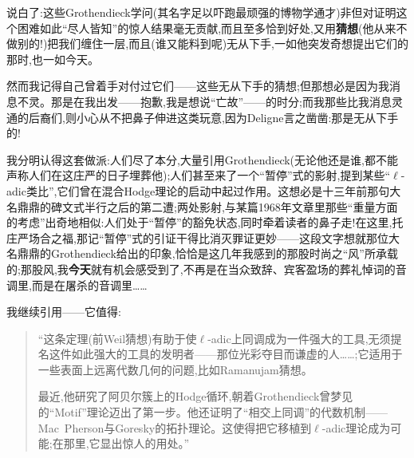 说白了:这些Grothendieck学问(其名字足以吓跑最顽强的博物学通才)非但对证明这个困难如此“尽人皆知”的惊人结果毫无贡献,而且至多恰到好处,又用\textbf{猜想}(他从来不做别的!)把我们缠住一层,而且(谁又能料到呢)无从下手,一如他突发奇想提出它们的那时,也一如今天。

\dmark{}然而我记得自己曾着手对付过它们——这些无从下手的猜想;但那想必是因为我消息不灵。那是在我出发——抱歉,我是想说“亡故”——的时分;而我那些比我消息灵通的后裔们,则小心从不把鼻子伸进这类玩意,因为Deligne言之凿凿:那是无从下手的!

我分明认得这套做派:人们尽了本分,大量引用Grothendieck(无论他还是谁,都不能声称人们在这庄严的日子埋葬他);人们甚至来了一个“暂停”式的影射,提到某些“$\ell$-adic类比”,它们曾在混合Hodge理论的启动中起过作用。这想必是十三年前那句大名鼎鼎的碑文式半行之后的第二遭;两处影射,与某篇1968年文章里那些“重量方面的考虑”出奇地相似:人们处于“暂停”的豁免状态,同时牵着读者的鼻子走!在这里,托庄严场合之福,那记“暂停”式的引证干得比消灭罪证更妙——这段文字想就那位大名鼎鼎的Grothendieck给出的印象,恰恰是这几年我感到的那股时尚之“风”所承载的;那股风,我\textbf{今天}就有机会感受到了,不再是在当众致辞、宾客盈场的葬礼悼词的音调里,而是在屠杀的音调里……

我继续引用——它值得:

\begin{quote}
“这条定理(前Weil猜想)有助于使$\ell$-adic上同调成为一件强大的工具,无须提名这件如此强大的工具的发明者——那位光彩夺目而谦虚的人……;它适用于一些表面上远离代数几何的问题,比如Ramanujam猜想。

最近,他研究了阿贝尔簇上的Hodge循环,朝着Grothendieck曾梦见的“Motif”理论迈出了第一步。他还证明了“相交上同调”的代数机制——Mac~Pherson与Goresky的拓扑理论。这使得把它移植到$\ell$-adic理论成为可能;在那里,它显出惊人的用处。”
\end{quote}


